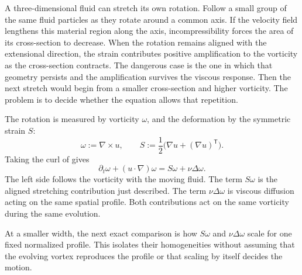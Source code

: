 A three-dimensional fluid can stretch its own rotation.
Follow a small group of the same fluid particles as they rotate around a common axis.
If the velocity field lengthens this material region along the axis, incompressibility forces the area of its cross-section to decrease.
When the rotation remains aligned with the extensional direction, the strain contributes positive amplification to the vorticity as the cross-section contracts.
The dangerous case is the one in which that geometry persists and the amplification survives the viscous response.
Then the next stretch would begin from a smaller cross-section and higher vorticity.
The problem is to decide whether the equation allows that repetition.

The rotation is measured by vorticity \(\omega\), and the deformation by the symmetric strain \(S\):
\[
  \omega:=\nabla\times u,
  \qquad
  S:=\frac12\bigl(\nabla u+(\nabla u)^{\mathsf T}\bigr).
\]
Taking the curl of \NavierStokes{} gives
\begin{equation}\label{eq:VorticityEquation}
  \partial_t\omega+(u\cdot\nabla)\omega
  =S\omega+\nu\Delta\omega.
\end{equation}
The left side follows the vorticity with the moving fluid.
The term \(S\omega\) is the aligned stretching contribution just described.
The term \(\nu\Delta\omega\) is viscous diffusion acting on the same spatial profile.
Both contributions act on the same vorticity during the same evolution.

At a smaller width, the next exact comparison is how \(S\omega\) and \(\nu\Delta\omega\) scale for one fixed normalized profile.
This isolates their homogeneities without assuming that the evolving vortex reproduces the profile or that scaling by itself decides the motion.
